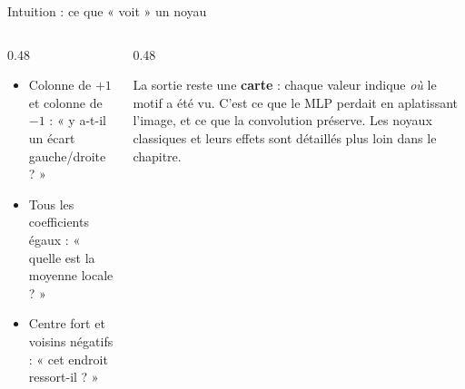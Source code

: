 \begin{frame}{Intuition : ce que « voit » un noyau}
\begin{columns}[t]
\begin{column}{0.48\textwidth}
\begin{ebox}
\begin{itemize}
  \item Colonne de $+1$ et colonne de $-1$ : « y a-t-il un écart gauche/droite ? »
  \item Tous les coefficients égaux : « quelle est la moyenne locale ? »
  \item Centre fort et voisins négatifs : « cet endroit ressort-il ? »
\end{itemize}
\end{ebox}
\end{column}
\begin{column}{0.48\textwidth}
\begin{kbox}
La sortie reste une \textbf{carte} : chaque valeur indique \emph{où} le motif a été vu.
C'est ce que le MLP perdait en aplatissant l'image, et ce que la convolution préserve.
Les noyaux classiques et leurs effets sont détaillés plus loin dans le chapitre.
\end{kbox}
\end{column}
\end{columns}
\end{frame}

